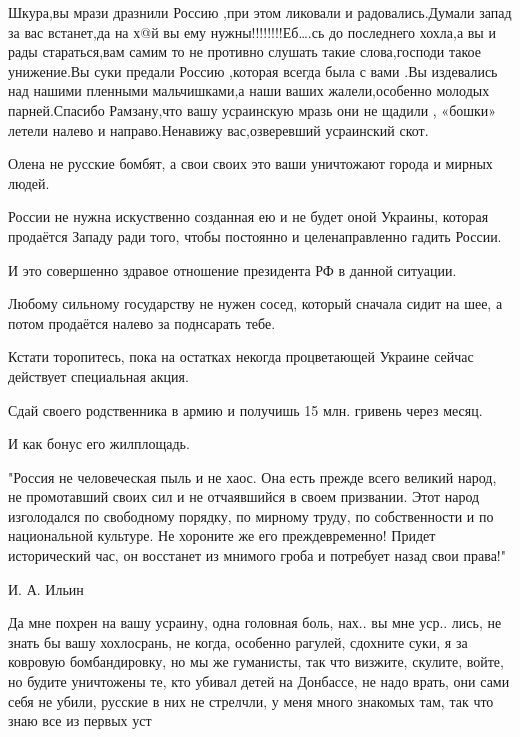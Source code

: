 
Шкура,вы мрази дразнили Россию ,при этом ликовали и радовались.Думали запад за
вас встанет,да на х@й вы ему нужны!!!!!!!!Еб….сь до последнего хохла,а вы и
рады стараться,вам самим то не противно слушать такие слова,господи такое
унижение.Вы суки предали Россию ,которая всегда была с вами .Вы издевались над
нашими пленными мальчишками,а наши ваших жалели,особенно молодых парней.Спасибо
Рамзану,что вашу усраинскую мразь они не щадили , «бошки» летели налево и
направо.Ненавижу вас,озверевший усраинский скот.


Олена не русские бомбят, а свои своих это ваши уничтожают города и мирных
людей.


России не нужна искуственно созданная ею и не будет оной Украины, которая
продаётся Западу ради того, чтобы постоянно и целенаправленно гадить России.

И это совершенно здравое отношение президента РФ в данной ситуации.

Любому сильному государству не нужен сосед, который сначала сидит на шее, а
потом продаётся налево за поднсарать тебе.

Кстати торопитесь, пока на остатках некогда процветающей Украине сейчас
действует специальная акция.

Сдай своего родственника в армию и получишь 15 млн. гривень через месяц.

И как бонус его жилплощадь.


"Россия не человеческая пыль и не хаос. Она есть прежде всего великий народ, не
промотавший своих сил и не отчаявшийся в своем призвании. Этот народ
изголодался по свободному порядку, по мирному труду, по собственности и по
национальной культуре. Не хороните же его преждевременно! Придет исторический
час, он восстанет из мнимого гроба и потребует назад свои права!"

И. А. Ильин


Да мне похрен на вашу усраину, одна головная боль, нах.. вы мне уср.. лись, не
знать бы вашу хохлосрань, не когда, особенно рагулей, сдохните суки, я за
ковровую бомбандировку, но мы же гуманисты, так что визжите, скулите, войте, но
будите уничтожены те, кто убивал детей на Донбассе, не надо врать, они сами
себя не убили, русские в них не стрелчли, у меня много знакомых там, так что
знаю все из первых уст

